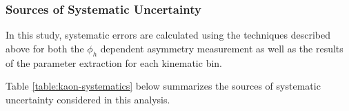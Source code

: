 %

\subsubsection*{Sources of Systematic Uncertainty}
In this study, systematic errors are calculated using the techniques described above for both the $\phi_h$ dependent asymmetry measurement as well as the results of the parameter extraction for each kinematic bin.

Table \ref{table:kaon-systematics} below summarizes the sources of systematic uncertainty considered in this analysis.

